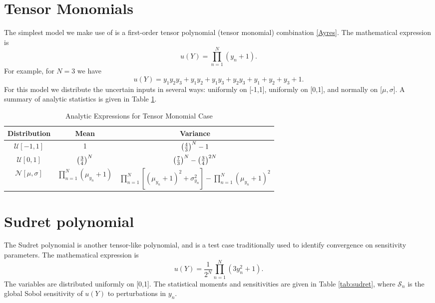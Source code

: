 \section{Tensor Monomials}\label{mod:first tensor poly}
The simplest model we make use of is a first-order tensor polynomial (tensor monomial) combination \ref{Ayres}.
The mathematical expression is
\begin{equation}
  u(Y) = \prod_{n=1}^N (y_n+1).
\end{equation}
For example, for $N=3$ we have
\begin{equation}
  u(Y) = y_1y_2y_3 + y_1y_2 + y_1y_3 + y_2y_3 + y_1 + y_2 + y_3 + 1.
\end{equation}
For this model we distribute the uncertain inputs in several ways: uniformly on [-1,1], uniformly on
[0,1], and normally on [$\mu,\sigma$]. A summary of analytic statistics is given in Table \ref{tab:tensormono moments}.

\begin{table}[H]
  \centering
  \begin{tabular}{c|c|c}
    Distribution & Mean & Variance \\\hline
    $\mathcal{U}[-1,1]$ & 1 & $\qty(\frac{4}{3})^N - 1$ \\
    $\mathcal{U}[0,1]$ & $\qty(\frac{3}{4})^N$ & $\qty(\frac{7}{3})^N - \qty(\frac{3}{4})^{2N}$ \\
    $\mathcal{N}[\mu,\sigma]$ & $\prod_{n=1}^N (\mu_{y_n}+1)$ & $\prod_{n=1}^N[(\mu_{y_n}+1)^2+\sigma_{y_n}^2]
    - \prod_{n=1}^N (\mu_{y_n}+1)^2$
  \end{tabular}
  \caption{Analytic Expressions for Tensor Monomial Case}
  \label{tab:tensormono moments}
\end{table}


\section{Sudret polynomial}\label{mod:sudret}
The Sudret polynomial \cite{sudret} is another tensor-like polynomial, and is a test case traditionally used to
identify convergence on sensitivity parameters.  The mathematical expression is
\begin{equation}
  u(Y) = \frac{1}{2^N}\prod_{n=1}^N (3y_n^2+1).
\end{equation}
The variables are distributed uniformly on [0,1].  The statistical moments and sensitivities are given in
Table \ref{tab:sudret}, where $\mathcal{S}_n$ is the global Sobol sensitivity of $u(Y)$ to perturbations in
$y_n$.

